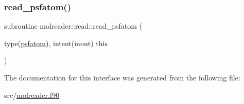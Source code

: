 \subsubsection{\texorpdfstring{read\+\_\+psfatom()}{read\_psfatom()}}
{\footnotesize\ttfamily subroutine molreader\+::read\+::read\+\_\+psfatom (\begin{DoxyParamCaption}\item[{type(\hyperlink{structmolreader_1_1psfatom}{psfatom}), intent(inout)}]{this }\end{DoxyParamCaption})\hspace{0.3cm}{\ttfamily [private]}}



The documentation for this interface was generated from the following file\+:\begin{DoxyCompactItemize}
\item 
src/\hyperlink{molreader_8f90}{molreader.\+f90}\end{DoxyCompactItemize}
